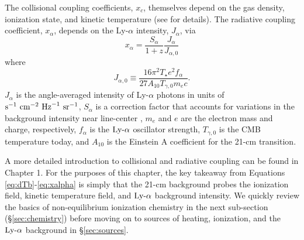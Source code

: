 The collisional coupling coefficients, $x_c$, themselves depend on the gas density, ionization state, and kinetic temperature (see \cite{Zygelman2005} for details). The radiative coupling coefficient, $x_{\alpha}$, depends on the Ly-$\alpha$ intensity, $J_{\alpha}$, via
\begin{equation}
    x_{\alpha} = \frac{S_{\alpha}}{1+z} \frac{J_{\alpha}}{{J}_{\alpha,0}} \label{eq:xalpha}
\end{equation}
where
\begin{equation}
    J_{\alpha,0} \equiv \frac{16\pi^2 T_{\star} e^2 f_{\alpha}}{27 A_{10} T_{\gamma,0} m_e c} . \label{eq:Jnorm}
\end{equation}
$J_{\alpha}$ is the angle-averaged intensity of Ly-$\alpha$ photons in
units of $\text{s}^{-1} \ \text{cm}^{-2} \ \mathrm{Hz}^{-1} \ \text{sr}^{-1}$, $S_{\alpha}$ is a correction factor that
accounts for variations in the background intensity near line-center
\cite{Chen2004,FurlanettoPritchard2006,Hirata2006}, $m_e$ and $e$ are the
electron mass and charge, respectively, $f_{\alpha}$ is the $\text{Ly-}\alpha$ oscillator
strength, $T_{\gamma,0}$ is the CMB temperature today, and $A_{10}$ is the Einstein A coefficient for the 21-cm transition.

A more detailed introduction to collisional and radiative coupling can be found in Chapter 1. For the purposes of this chapter, the key takeaway from Equations \ref{eq:dTb}-\ref{eq:xalpha} is simply that the 21-cm background probes the ionization field, kinetic temperature field, and $\text{Ly-}\alpha$ background intensity. We quickly review the basics of non-equilibrium ionization chemistry in the next sub-section (\S\ref{sec:chemistry}) before moving on to sources of heating, ionization, and the $\text{Ly-}\alpha$ background in \S\ref{sec:sources}.



